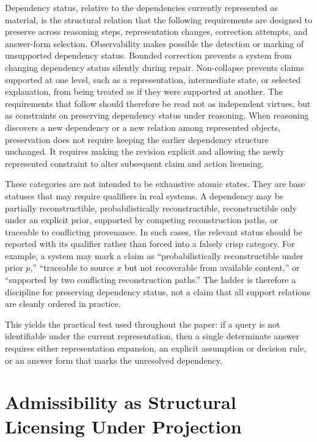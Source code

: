 \documentclass[11pt]{article}
\begin{document}
Dependency status, relative to the dependencies currently represented as material, is the structural relation that the following requirements are designed to preserve across reasoning steps, representation changes, correction attempts, and answer-form selection. Observability makes possible the detection or marking of unsupported dependency status. Bounded correction prevents a system from changing dependency status silently during repair. Non-collapse prevents claims supported at one level, such as a representation, intermediate state, or selected explanation, from being treated as if they were supported at another. The requirements that follow should therefore be read not as independent virtues, but as constraints on preserving dependency status under reasoning. When reasoning discovers a new dependency or a new relation among represented objects, preservation does not require keeping the earlier dependency structure unchanged. It requires making the revision explicit and allowing the newly represented constraint to alter subsequent claim and action licensing.

These categories are not intended to be exhaustive atomic states. They are base statuses that may require qualifiers in real systems. A dependency may be partially reconstructible, probabilistically reconstructible, reconstructible only under an explicit prior, supported by competing reconstruction paths, or traceable to conflicting provenance. In such cases, the relevant status should be reported with its qualifier rather than forced into a falsely crisp category. For example, a system may mark a claim as ``probabilistically reconstructible under prior $p$,'' ``traceable to source $x$ but not recoverable from available content,'' or ``supported by two conflicting reconstruction paths.'' The ladder is therefore a discipline for preserving dependency status, not a claim that all support relations are cleanly ordered in practice.

This yields the practical test used throughout the paper: if a query is not identifiable under the current representation, then a single determinate answer requires either representation expansion, an explicit assumption or decision rule, or an answer form that marks the unresolved dependency.

\section{Admissibility as Structural Licensing Under Projection}
\end{document}
